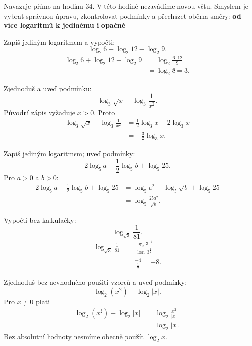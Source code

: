 \documentclass[11pt,a4paper]{article}
\begin{document}
Navazuje přímo na hodinu 34. V této hodině nezavádíme novou větu. Smyslem je vybrat správnou úpravu, zkontrolovat podmínky a přecházet oběma směry: \textbf{od více logaritmů k jedinému i opačně}.
\begin{prikladReseniBox}[title={Příklad 1}]
Zapiš jediným logaritmem a vypočti:
\[
\log_2 6+\log_2 12-\log_2 9.
\]
\tcblower
\[
\begin{aligned}
\log_2 6+\log_2 12-\log_2 9
&=\log_2\frac{6\cdot12}{9}\\
&=\log_2 8=3.
\end{aligned}
\]
\end{prikladReseniBox}
\begin{prikladReseniBox}[title={Příklad 2}]
Zjednoduš a uveď podmínku:
\[
\log_3\sqrt{x}+\log_3\frac1{x^2}.
\]
\tcblower
Původní zápis vyžaduje $x>0$. Proto
\[
\begin{aligned}
\log_3\sqrt{x}+\log_3\frac1{x^2}
&=\frac12\log_3 x-2\log_3 x\\
&=-\frac32\log_3 x.
\end{aligned}
\]
\end{prikladReseniBox}
\begin{prikladReseniBox}[title={Příklad 3}]
Zapiš jediným logaritmem; uveď podmínky:
\[
2\log_5 a-\frac12\log_5 b+\log_5 25.
\]
\tcblower
Pro $a>0$ a $b>0$:
\[
\begin{aligned}
2\log_5 a-\frac12\log_5 b+\log_5 25
&=\log_5 a^2-\log_5\sqrt b+\log_5 25\\
&=\log_5\frac{25a^2}{\sqrt b}.
\end{aligned}
\]
\end{prikladReseniBox}
\begin{prikladReseniBox}[title={Příklad 4}]
Vypočti bez kalkulačky:
\[
\log_{\sqrt3}\frac1{81}.
\]
\tcblower
\[
\begin{aligned}
\log_{\sqrt3}\frac1{81}
&=\frac{\log_3 3^{-4}}{\log_3 3^{\frac12}}\\
&=\frac{-4}{\frac12}=-8.
\end{aligned}
\]
\end{prikladReseniBox}
\begin{prikladReseniBox}[title={Příklad 5}]
Zjednoduš bez nevhodného použití vzorců a uveď podmínky:
\[
\log_2(x^2)-\log_2|x|.
\]
\tcblower
Pro $x\ne0$ platí
\[
\begin{aligned}
\log_2(x^2)-\log_2|x|
&=\log_2\frac{x^2}{|x|}\\
&=\log_2|x|.
\end{aligned}
\]
Bez absolutní hodnoty nesmíme obecně použít $\log_2 x$.
\end{prikladReseniBox}
\end{document}
